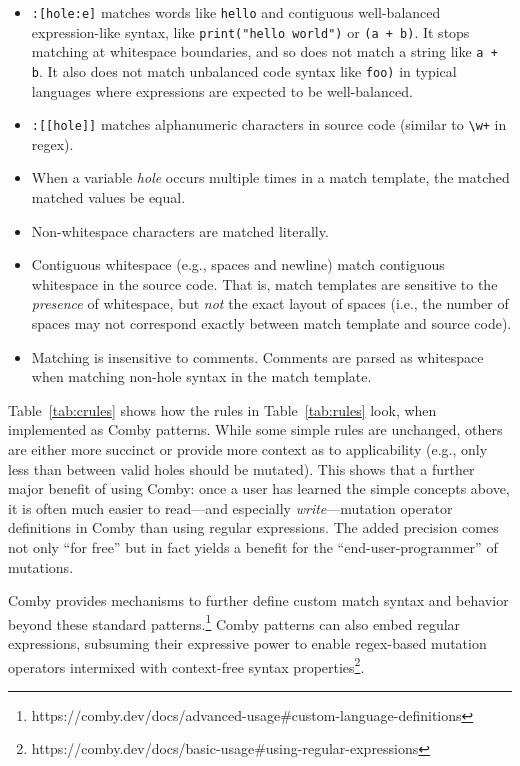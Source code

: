 \documentclass[sigconf,review, anonymous]{acmart}
\begin{document}
{\begin{itemize}
\item \texttt{\small:[hole:e]} matches words like \texttt{\small hello} and contiguous well-balanced expression-like syntax, like \texttt{\small print("hello world")} or \texttt{\small (a + b)}. It stops matching at whitespace boundaries, and so does not match a string like \texttt{\small a + b}. It also does not match unbalanced code syntax like \texttt{\small foo)} in typical languages where expressions are expected to be well-balanced.

\item \texttt{\small :[[hole]]} matches alphanumeric characters in source code (similar to \texttt{\small\textbackslash w+} in regex).

\item When a variable \emph{hole} occurs multiple times in a match template, the matched matched values be equal.

\item Non-whitespace characters are matched literally.

\item Contiguous whitespace (e.g., spaces and newline) match contiguous whitespace in the source code. That is, match templates are sensitive to the \emph{presence} of whitespace, but \emph{not} the exact layout of spaces (i.e., the number of spaces may not correspond exactly between match template and source code).

\item Matching is insensitive to comments. Comments are parsed as whitespace when matching non-hole syntax in the match template.

\end{itemize}

Table~\ref{tab:crules} shows how the rules in Table~\ref{tab:rules}
look, when implemented as Comby patterns.  While some simple rules are
unchanged, others are either more succinct or provide more context as
to applicability (e.g., only less than between valid holes should be
mutated).  This shows that a
further major benefit of using Comby: once a user has learned
the simple concepts above, it is often much easier to read---and
especially \emph{write}---mutation
operator definitions in Comby than using regular expressions.  The
added precision comes not only ``for free'' but in fact yields a
benefit for the ``end-user-programmer'' of mutations.

Comby provides mechanisms to further define custom match syntax and behavior
beyond these standard patterns.\footnote{https://comby.dev/docs/advanced-usage\#custom-language-definitions} Comby patterns can also embed regular expressions, subsuming their
expressive power to enable regex-based mutation operators intermixed with
context-free syntax
properties\footnote{https://comby.dev/docs/basic-usage\#using-regular-expressions}.

}
\end{document}
